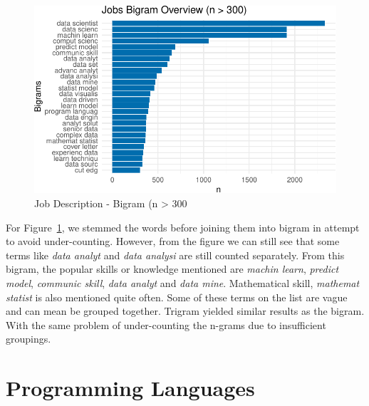 \documentclass[
  letterpaper,
]{report}
\begin{document}
\begin{figure}

{\centering \includegraphics{./03_3-jobtext_files/figure-pdf/fig-employer-bigram-1.pdf}

}

\caption{\label{fig-employer-bigram}Job Description - Bigram (n
\textgreater{} 300}

\end{figure}

For Figure~\ref{fig-employer-bigram}, we stemmed the words before
joining them into bigram in attempt to avoid under-counting. However,
from the figure we can still see that some terms like \emph{data analyt}
and \emph{data analysi} are still counted separately. From this bigram,
the popular skills or knowledge mentioned are \emph{machin learn},
\emph{predict model}, \emph{communic skill}, \emph{data analyt} and
\emph{data mine}. Mathematical skill, \emph{mathemat statist} is also
mentioned quite often. Some of these terms on the list are vague and can
mean be grouped together. Trigram yielded similar results as the bigram.
With the same problem of under-counting the n-grams due to insufficient
groupings.

\hypertarget{programming-languages}{%
\section{Programming Languages}\label{programming-languages}}
\end{document}
